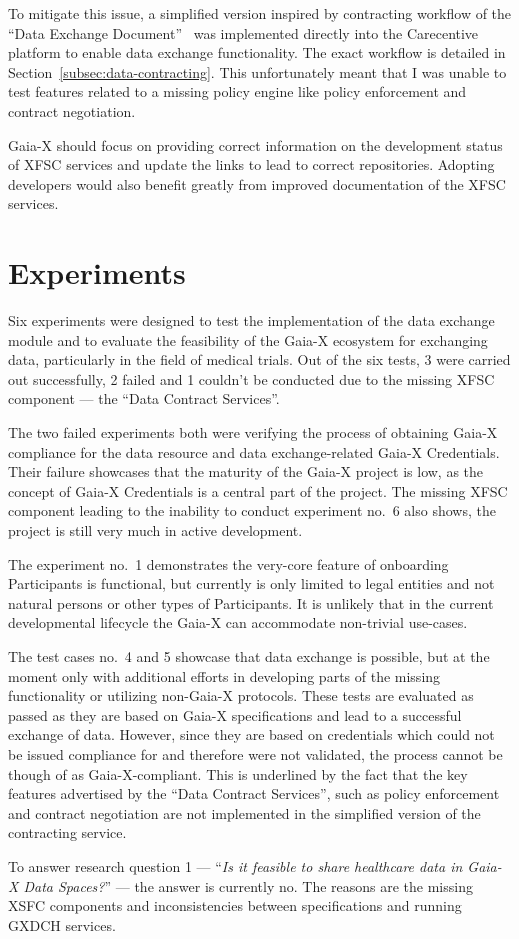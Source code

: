 To mitigate this issue, a simplified version inspired by contracting workflow of the ``Data Exchange Document''~\cite{gaiax_data_exchange_document} was implemented directly into the Carecentive platform to enable data exchange functionality.
The exact workflow is detailed in Section~\ref{subsec:data-contracting}.
This unfortunately meant that I was unable to test features related to a missing policy engine like policy enforcement and contract negotiation.

Gaia-X should focus on providing correct information on the development status of XFSC services and update the links to lead to correct repositories.
Adopting developers would also benefit greatly from improved documentation of the XFSC services.

\section{Experiments}\label{sec:experiments_discussion}

Six experiments were designed to test the implementation of the data exchange module and to evaluate the feasibility of the Gaia-X ecosystem for exchanging data, particularly in the field of medical trials.
Out of the six tests, 3 were carried out successfully, 2 failed and 1 couldn't be conducted due to the missing XFSC component --- the ``Data Contract Services''.

The two failed experiments both were verifying the process of obtaining Gaia-X compliance for the data resource and data exchange-related Gaia-X Credentials.
Their failure showcases that the maturity of the Gaia-X project is low, as the concept of Gaia-X Credentials is a central part of the project.
The missing XFSC component leading to the inability to conduct experiment no.~6 also shows, the project is still very much in active development.

The experiment no.~1 demonstrates the very-core feature of onboarding Participants is functional, but currently is only limited to legal entities and not natural persons or other types of Participants.
It is unlikely that in the current developmental lifecycle the Gaia-X can accommodate non-trivial use-cases.

The test cases no.~4 and 5 showcase that data exchange is possible, but at the moment only with additional efforts in developing parts of the missing functionality or utilizing non-Gaia-X protocols.
These tests are evaluated as passed as they are based on Gaia-X specifications and lead to a successful exchange of data.
However, since they are based on credentials which could not be issued compliance for and therefore were not validated, the process cannot be though of as Gaia-X-compliant.
This is underlined by the fact that the key features advertised by the ``Data Contract Services'', such as policy enforcement and contract negotiation are not implemented in the simplified version of the contracting service.

To answer research question 1 --- ``\textit{Is it feasible to share healthcare data in Gaia-X Data Spaces?}'' --- the answer is currently no.
The reasons are the missing XSFC components and inconsistencies between specifications and running GXDCH services.

